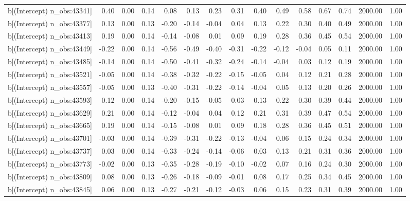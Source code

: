 \begin{table}[ht]
\begin{tabular}{rrrrrrrrrrrrrrr}
  b[(Intercept) n\_obs:43341] & 0.40 & 0.00 & 0.14 & 0.08 & 0.13 & 0.23 & 0.31 & 0.40 & 0.49 & 0.58 & 0.67 & 0.74 & 2000.00 & 1.00 \\ 
  b[(Intercept) n\_obs:43377] & 0.13 & 0.00 & 0.13 & -0.20 & -0.14 & -0.04 & 0.04 & 0.13 & 0.22 & 0.30 & 0.40 & 0.49 & 2000.00 & 1.00 \\ 
  b[(Intercept) n\_obs:43413] & 0.19 & 0.00 & 0.14 & -0.14 & -0.08 & 0.01 & 0.09 & 0.19 & 0.28 & 0.36 & 0.45 & 0.54 & 2000.00 & 1.00 \\ 
  b[(Intercept) n\_obs:43449] & -0.22 & 0.00 & 0.14 & -0.56 & -0.49 & -0.40 & -0.31 & -0.22 & -0.12 & -0.04 & 0.05 & 0.11 & 2000.00 & 1.00 \\ 
  b[(Intercept) n\_obs:43485] & -0.14 & 0.00 & 0.14 & -0.50 & -0.41 & -0.32 & -0.24 & -0.14 & -0.04 & 0.03 & 0.12 & 0.19 & 2000.00 & 1.00 \\ 
  b[(Intercept) n\_obs:43521] & -0.05 & 0.00 & 0.14 & -0.38 & -0.32 & -0.22 & -0.15 & -0.05 & 0.04 & 0.12 & 0.21 & 0.28 & 2000.00 & 1.00 \\ 
  b[(Intercept) n\_obs:43557] & -0.05 & 0.00 & 0.13 & -0.40 & -0.31 & -0.22 & -0.14 & -0.04 & 0.05 & 0.13 & 0.20 & 0.26 & 2000.00 & 1.00 \\ 
  b[(Intercept) n\_obs:43593] & 0.12 & 0.00 & 0.14 & -0.20 & -0.15 & -0.05 & 0.03 & 0.13 & 0.22 & 0.30 & 0.39 & 0.44 & 2000.00 & 1.00 \\ 
  b[(Intercept) n\_obs:43629] & 0.21 & 0.00 & 0.14 & -0.12 & -0.04 & 0.04 & 0.12 & 0.21 & 0.31 & 0.39 & 0.47 & 0.54 & 2000.00 & 1.00 \\ 
  b[(Intercept) n\_obs:43665] & 0.19 & 0.00 & 0.14 & -0.15 & -0.08 & 0.01 & 0.09 & 0.18 & 0.28 & 0.36 & 0.45 & 0.51 & 2000.00 & 1.00 \\ 
  b[(Intercept) n\_obs:43701] & -0.03 & 0.00 & 0.14 & -0.39 & -0.31 & -0.22 & -0.13 & -0.04 & 0.06 & 0.15 & 0.24 & 0.34 & 2000.00 & 1.00 \\ 
  b[(Intercept) n\_obs:43737] & 0.03 & 0.00 & 0.14 & -0.33 & -0.24 & -0.14 & -0.06 & 0.03 & 0.13 & 0.21 & 0.31 & 0.36 & 2000.00 & 1.00 \\ 
  b[(Intercept) n\_obs:43773] & -0.02 & 0.00 & 0.13 & -0.35 & -0.28 & -0.19 & -0.10 & -0.02 & 0.07 & 0.16 & 0.24 & 0.30 & 2000.00 & 1.00 \\ 
  b[(Intercept) n\_obs:43809] & 0.08 & 0.00 & 0.13 & -0.26 & -0.18 & -0.09 & -0.01 & 0.08 & 0.17 & 0.25 & 0.34 & 0.45 & 2000.00 & 1.00 \\ 
  b[(Intercept) n\_obs:43845] & 0.06 & 0.00 & 0.13 & -0.27 & -0.21 & -0.12 & -0.03 & 0.06 & 0.15 & 0.23 & 0.31 & 0.39 & 2000.00 & 1.00 \\ 

\end{tabular}
\end{table}
